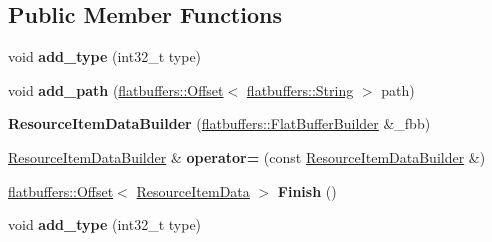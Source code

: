 \subsection*{Public Member Functions}
\begin{DoxyCompactItemize}
\item 
\mbox{\label{structflatbuffers_1_1ResourceItemDataBuilder_a67ddf881092b638aa36595a84383374d}} 
void {\bfseries add\+\_\+type} (int32\+\_\+t type)
\item 
\mbox{\label{structflatbuffers_1_1ResourceItemDataBuilder_aba092f96c65ce79dd73b018d24e8038d}} 
void {\bfseries add\+\_\+path} (\hyperlink{structflatbuffers_1_1Offset}{flatbuffers\+::\+Offset}$<$ \hyperlink{structflatbuffers_1_1String}{flatbuffers\+::\+String} $>$ path)
\item 
\mbox{\label{structflatbuffers_1_1ResourceItemDataBuilder_a0b60fc6e10179398c04f597df7c17173}} 
{\bfseries Resource\+Item\+Data\+Builder} (\hyperlink{classflatbuffers_1_1FlatBufferBuilder}{flatbuffers\+::\+Flat\+Buffer\+Builder} \&\+\_\+fbb)
\item 
\mbox{\label{structflatbuffers_1_1ResourceItemDataBuilder_ae418fedf1c4561d808053467f2884395}} 
\hyperlink{structflatbuffers_1_1ResourceItemDataBuilder}{Resource\+Item\+Data\+Builder} \& {\bfseries operator=} (const \hyperlink{structflatbuffers_1_1ResourceItemDataBuilder}{Resource\+Item\+Data\+Builder} \&)
\item 
\mbox{\label{structflatbuffers_1_1ResourceItemDataBuilder_aba266cd978d7113b9c8fa7a6ae0517af}} 
\hyperlink{structflatbuffers_1_1Offset}{flatbuffers\+::\+Offset}$<$ \hyperlink{structflatbuffers_1_1ResourceItemData}{Resource\+Item\+Data} $>$ {\bfseries Finish} ()
\item 
\mbox{\label{structflatbuffers_1_1ResourceItemDataBuilder_a67ddf881092b638aa36595a84383374d}} 
void {\bfseries add\+\_\+type} (int32\+\_\+t type)
\item 
\mbox{\label{structflatbuffers_1_1ResourceItemDataBuilder_aba092f96c65ce79dd73b018d24e8038d}} 

\end{DoxyCompactItemize}
